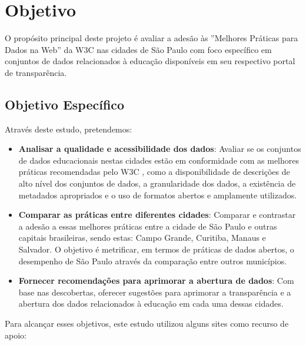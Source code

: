 \chapter{Objetivo}

O propósito principal deste projeto é avaliar a adesão às ''Melhores Práticas para Dados na Web'' da W3C \cite{W3C} nas cidades de São Paulo com foco específico em conjuntos de dados relacionados à educação disponíveis em seu respectivo portal de transparência.

\section{Objetivo Específico}

Através deste estudo, pretendemos:

\begin{itemize}
    \item \textbf{Analisar a qualidade e acessibilidade dos dados}: Avaliar se os conjuntos de dados educacionais nestas cidades estão em conformidade com as melhores práticas recomendadas pelo W3C \cite{W3CSUMMARY}, como a disponibilidade de descrições de alto nível dos conjuntos de dados, a granularidade dos dados, a existência de metadados apropriados e o uso de formatos abertos e amplamente utilizados.
    \item \textbf{Comparar as práticas entre diferentes cidades}: Comparar e contrastar a adesão a essas melhores práticas entre a cidade de São Paulo e outras capitais brasileiras, sendo estas: Campo Grande, Curitiba, Manaus e Salvador. O objetivo é metrificar, em termos de práticas de dados abertos, o desempenho de São Paulo através da comparação entre outros municípios.
    \item \textbf{Fornecer recomendações para aprimorar a abertura de dados}: Com base nas descobertas, oferecer sugestões para aprimorar a transparência e a abertura dos dados relacionados à educação em cada uma dessas cidades.
\end{itemize}

Para alcançar esses objetivos, este estudo utilizou alguns sites como recurso de apoio:

